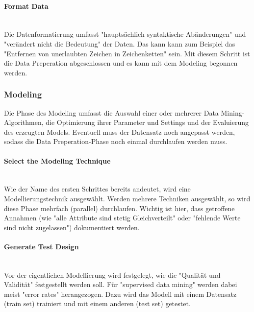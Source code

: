 \paragraph{Format Data}\mbox{} \\
Die Datenformatierung umfasst "hauptsächlich syntaktische Abänderungen" und "verändert nicht die Bedeutung"\citep[S.~22; eigene Übersetzung]{chapman_crisp-dm_2000} der Daten. Das kann kann zum Beispiel das "Entfernen von unerlaubten Zeichen in Zeichenketten"\citep[S.~17; eigene Übersetzung]{shearer_crisp-dm_2000} sein.\newline
Mit diesem Schritt ist die Data Preperation abgeschlossen und es kann mit dem Modeling begonnen werden.

\subsubsection{Modeling}
Die Phase des Modeling umfasst die Auswahl einer oder mehrerer Data Mining-Algorithmen, die Optimierung ihrer Parameter und Settings und der Evaluierung des erzeugten Models. Eventuell muss der Datensatz noch angepasst werden, sodass die Data Preperation-Phase noch einmal durchlaufen werden muss.\citep[Punkt 1.4.1.4]{larose_discovering_2014}

\paragraph{Select the Modeling Technique}\mbox{} \\
Wie der Name des ersten Schrittes bereits andeutet, wird eine Modellierungstechnik ausgewählt. Werden mehrere Techniken ausgewählt, so wird diese Phase mehrfach (parallel) durchlaufen. Wichtig ist hier, dass getroffene Annahmen (wie "alle Attribute sind stetig Gleichverteilt" oder "fehlende Werte sind nicht zugelassen"\citep[S.~24]{chapman_crisp-dm_2000}) dokumentiert werden.\citep[S.~17]{shearer_crisp-dm_2000}

\paragraph{Generate Test Design}\mbox{} \\
Vor der eigentlichen Modellierung wird festgelegt, wie die "Qualität und Validität"\citep[S.~24]{chapman_crisp-dm_2000} festgestellt werden soll. Für "supervised data mining" werden dabei meist "error rates"\citep[S.~24]{chapman_crisp-dm_2000} herangezogen. Dazu wird das Modell mit einem Datensatz (train set) trainiert und mit einem anderen (test set) getestet.\citep{shearer_crisp-dm_2000}

